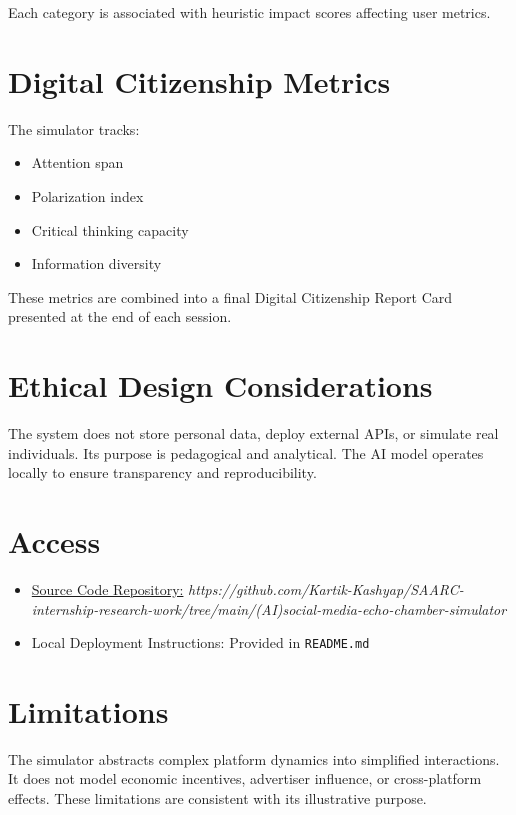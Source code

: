 \documentclass[12pt,a4paper]{report}
\begin{document}
Each category is associated with heuristic impact scores affecting user metrics.

\section{Digital Citizenship Metrics}

The simulator tracks:
\begin{itemize}
    \item Attention span
    \item Polarization index
    \item Critical thinking capacity
    \item Information diversity
\end{itemize}

These metrics are combined into a final Digital Citizenship Report Card presented at the end of each session.

\section{Ethical Design Considerations}

The system does not store personal data, deploy external APIs, or simulate real individuals. Its purpose is pedagogical and analytical. The AI model operates locally to ensure transparency and reproducibility.

\section{Access}

\begin{itemize}
    \item \href{https://github.com/Kartik-Kashyap/SAARC-internship-research-work/tree/main/(AI)social-media-echo-chamber-simulator}{Source Code Repository:} \textit{https://github.com/Kartik-Kashyap/SAARC-internship-research-work/tree/main/(AI)social-media-echo-chamber-simulator}
    \item Local Deployment Instructions: Provided in \texttt{README.md}
\end{itemize}

\section{Limitations}

The simulator abstracts complex platform dynamics into simplified interactions. It does not model economic incentives, advertiser influence, or cross-platform effects. These limitations are consistent with its illustrative purpose.
\end{document}
